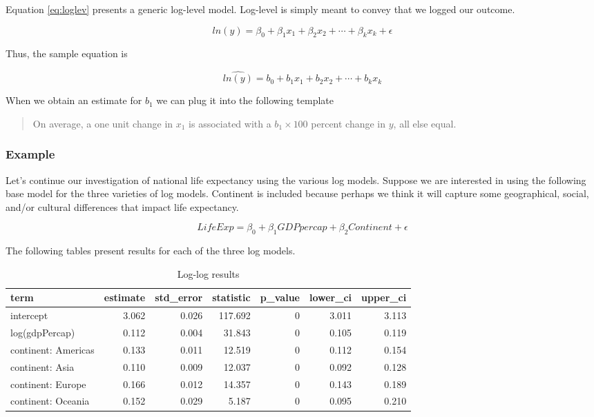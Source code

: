 \documentclass[
]{book}
\begin{document}
Equation \eqref{eq:loglev} presents a generic log-level model. Log-level is simply meant to convey that we logged our outcome.

\begin{equation}
ln(y)=\beta_0 + \beta_1x_1 + \beta_2x_2 + \cdots + \beta_kx_k + \epsilon
\label{eq:loglev}
\end{equation}

Thus, the sample equation is

\begin{equation}
\hat{ln(y)}=b_0 + b_1x_1 + b_2x_2 + \cdots + b_kx_k
\label{eq:loglevsamp}
\end{equation}

When we obtain an estimate for \(b_1\) we can plug it into the following template

\begin{quote}
On average, a one unit change in \(x_1\) is associated with a \(b_1 \times 100\) percent change in \(y\), all else equal.
\end{quote}

\hypertarget{example-1}{%
\subsubsection*{Example}\label{example-1}}


Let's continue our investigation of national life expectancy using the various log models. Suppose we are interested in using the following base model for the three varieties of log models. Continent is included because perhaps we think it will capture some geographical, social, and/or cultural differences that impact life expectancy.

\begin{equation}
LifeExp=\beta_0 + \beta_1GDPpercap + \beta_2Continent + \epsilon
\label{eq:logex}
\end{equation}

The following tables present results for each of the three log models.

\begin{table}

\caption{\label{tab:loglogtab}Log-log results}
\centering
\begin{tabular}[t]{l|r|r|r|r|r|r}
\hline
term & estimate & std\_error & statistic & p\_value & lower\_ci & upper\_ci\\
\hline
intercept & 3.062 & 0.026 & 117.692 & 0 & 3.011 & 3.113\\
\hline
log(gdpPercap) & 0.112 & 0.004 & 31.843 & 0 & 0.105 & 0.119\\
\hline
continent: Americas & 0.133 & 0.011 & 12.519 & 0 & 0.112 & 0.154\\
\hline
continent: Asia & 0.110 & 0.009 & 12.037 & 0 & 0.092 & 0.128\\
\hline
continent: Europe & 0.166 & 0.012 & 14.357 & 0 & 0.143 & 0.189\\
\hline
continent: Oceania & 0.152 & 0.029 & 5.187 & 0 & 0.095 & 0.210\\
\hline
\end{tabular}
\end{table}
\end{document}
